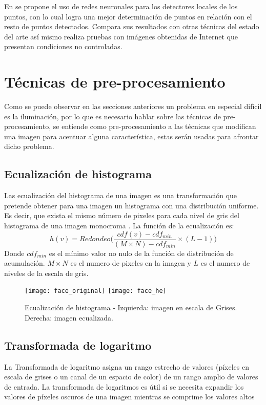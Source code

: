 En \cite{baltrusaitis2013constrained} se propone el uso de redes neuronales para los detectores locales de los puntos, con lo cual logra una mejor determinación de puntos en relación con el resto de puntos detectados. Compara sus resultados con otras técnicas del estado del arte así mismo realiza pruebas con imágenes obtenidas de Internet que presentan condiciones no controladas.

\section{Técnicas de pre-procesamiento}
Como se puede observar en las secciones anteriores un problema en especial difícil es la iluminación, por lo que es necesario hablar sobre las técnicas de pre-procesamiento, se entiende como pre-procesamiento a las técnicas que modifican una imagen para acentuar alguna característica, estas serán usadas para afrontar dicho problema.

\subsection{Ecualización de histograma}
Las ecualización del histograma de una imagen es una transformación que pretende obtener para una imagen un histograma con una distribución uniforme. Es decir, que exista el mismo número de pixeles para cada nivel de gris del histograma de una imagen monocroma \cite{orlova2002image}.
La función de la ecualización es:
\begin{equation}
h(v)=Redondeo\Bigg(\frac{cdf(v)-cdf_{min}}{(M\times N)-cdf_{min}} \times (L-1)\Bigg)
\end{equation}
Donde $cdf_{min}$ es el mínimo valor no nulo de la función de distribución de acumulación. $M\times N$ es el numero de pixeles en la imagen y $L$ es el numero de niveles de la escala de gris.

\begin{figure}[h]
\center
\texttt{[image: face\_original]}
\hspace{1cm}
\texttt{[image: face\_he]}
\caption{Ecualización de histograma - Izquierda: imagen en escala de Grises. Derecha: imagen ecualizada.}
\label{im:he}
\end{figure}


\subsection{Transformada de logaritmo}
La Transformada de logaritmo asigna un rango estrecho de valores (píxeles en escala de grises o un canal de un espacio de color) de un rango amplio de valores de entrada. La transformada de logaritmos es útil si se necesita expandir los valores de píxeles oscuros de una imagen mientras se comprime los valores altos \cite{thamiz2015liter}

